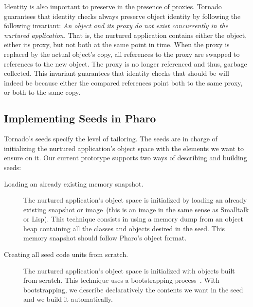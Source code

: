 Identity is also important to preserve in the presence of proxies. Tornado guarantees that identity checks always preserve object identity by following the following invariant: \emph{An object and its proxy do not exist concurrently in the nurtured application.} That is, the nurtured application contains either the object, either its proxy, but not both at the same point in time. When the proxy is replaced by the actual object's copy, all references to the proxy are swapped to references to the new object. The proxy is no longer referenced and thus, garbage collected. This invariant guarantees that identity checks that should be  will indeed be  because either the compared references point both to the same proxy, or both to the same copy.

\subsection{Implementing Seeds in Pharo}

Tornado's seeds specify the level of tailoring. The seeds are in charge of initializing the nurtured application's object space with the elements we want to ensure on it. Our current prototype supports two ways of describing and building seeds: 

\begin{description}
\item[Loading an already existing memory snapshot.] The nurtured application's object space is initialized by loading an already existing snapshot or image~(\ie this is an image in the same sense as Smalltalk or Lisp). This technique consists in using a memory dump from an object heap containing all the classes and objects desired in the seed. This memory snapshot should follow Pharo's object format. 
\item[Creating all seed code units from scratch.] The nurtured application's object space is initialized with objects built from scratch. This technique uses a bootstrapping process~\cite{Poli13b}. With bootstrapping, we describe declaratively the contents we want in the seed and we build it automatically.
\end{description}


